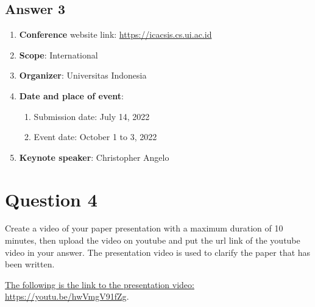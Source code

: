 \documentclass[
  11pt, %
]{assignment}
\begin{document}
\subsection*{Answer 3}

\begin{enumerate}
  \item \textbf{Conference} website link: \url{https://icacsis.cs.ui.ac.id}
  \item \textbf{Scope}: International
  \item \textbf{Organizer}: Universitas Indonesia
  \item \textbf{Date and place of event}:
        \begin{enumerate}[>]
          \item Submission date: July 14, 2022
          \item Event date: October 1 to 3, 2022
        \end{enumerate}
  \item \textbf{Keynote speaker}: Christopher Angelo
\end{enumerate}

\section*{Question 4}
\begin{problem}
Create a video of your paper presentation with a maximum duration of 10 minutes, then upload the video on youtube and put the url link of the youtube video in your answer. The presentation video is used to clarify the paper that has been written.
\end{problem}

\href{https://youtu.be/hwVmgV91fZg}{The following is the link to the presentation video: https://youtu.be/hwVmgV91fZg}.
\end{document}
